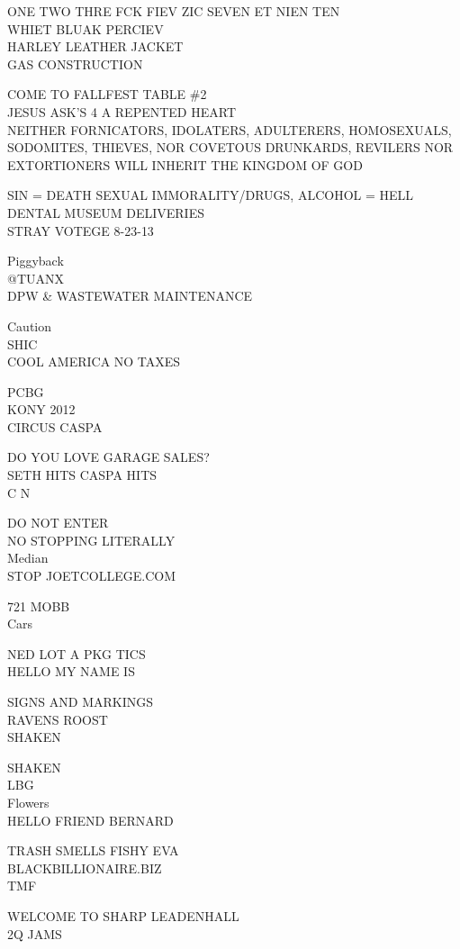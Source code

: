 \documentclass[10pt,letterpaper]{article}
\begin{document}
ONE TWO THRE FCK FIEV ZIC SEVEN ET NIEN TEN\\
WHIET BLUAK PERCIEV\\
HARLEY LEATHER JACKET\\
GAS CONSTRUCTION

COME TO FALLFEST TABLE \#2\\
JESUS ASK'S 4 A REPENTED HEART\\
NEITHER FORNICATORS, IDOLATERS, ADULTERERS, HOMOSEXUALS, SODOMITES, THIEVES, NOR COVETOUS DRUNKARDS, REVILERS NOR EXTORTIONERS WILL INHERIT THE KINGDOM OF GOD

SIN = DEATH SEXUAL IMMORALITY/DRUGS, ALCOHOL = HELL\\
DENTAL MUSEUM DELIVERIES\\
STRAY VOTEGE 8{-}23{-}13

Piggyback\\
@TUANX\\
DPW \& WASTEWATER MAINTENANCE

Caution\\
SHIC\\
COOL AMERICA NO TAXES

PCBG\\
KONY 2012\\
CIRCUS CASPA

DO YOU LOVE GARAGE SALES?\\
SETH HITS CASPA HITS\\
C N

DO NOT ENTER\\
NO STOPPING LITERALLY\\
Median\\
STOP JOETCOLLEGE.COM

721 MOBB\\
Cars

NED LOT A PKG TICS\\
HELLO MY NAME IS

SIGNS AND MARKINGS\\
RAVENS ROOST\\
SHAKEN

SHAKEN\\
LBG\\
Flowers\\
HELLO FRIEND BERNARD

TRASH SMELLS FISHY EVA\\
BLACKBILLIONAIRE.BIZ\\
TMF

WELCOME TO SHARP LEADENHALL\\
2Q JAMS
\end{document}

